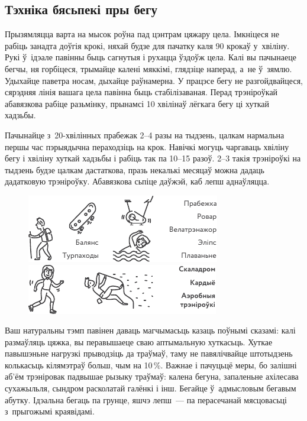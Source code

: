 \subsection*{Тэхніка бясьпекі пры бегу}

Прызямляцца варта на мысок роўна пад цэнтрам цяжару цела. Імкніцеся не рабіць занадта доўгія крокі, няхай будзе для пачатку каля 90 крокаў у~хвіліну. Рукі ў~ідэале павінны быць сагнутыя і рухацца ўздоўж цела. Калі вы пачынаеце бегчы, ня горбіцеся, трымайце калені мяккімі, глядзіце наперад, а~не ў~зямлю. Удыхайце паветра носам, дыхайце раўнамерна. У працэсе бегу не разгойдвайцеся, сярэдняя лінія вашага цела павінна быць стабілізаваная. Перад трэніроўкай абавязкова рабіце разьмінку, прынамсі 10 хвілінаў лёгкага бегу ці хуткай хадзьбы.

Пачынайце з~20-хвілінных прабежак 2--4 разы на тыдзень, цалкам нармальна першы час пэрыядычна пераходзіць на крок. Навічкі могуць чаргаваць хвіліну бегу і хвіліну хуткай хадзьбы і рабіць так па 10--15 разоў. 2--3 такія трэніроўкі на тыдзень будзе цалкам дастаткова, празь некалькі месяцаў можна дадаць дадатковую трэніроўку. Абавязкова сьпіце даўжэй, каб лепш аднаўляцца.

\begin{figure}[htb!]
  \centering
  \includegraphics[scale=1.5]{willpower/ch5/8.pdf}\\
  \medskip
  \includegraphics[scale=1.5]{willpower/ch5/9.pdf}
\end{figure}

Ваш натуральны тэмп павінен даваць магчымасьць казаць поўнымі сказамі: калі размаўляць цяжка, вы перавышаеце сваю аптымальную хуткасьць. Хуткае павышэньне нагрузкі прыводзіць да траўмаў, таму не павялічвайце штотыдзень колькасьць кілямэтраў больш, чым на 10\,\%. Важнае і пачуцьцё меры, бо залішні аб'ём трэніровак падвышае рызыку траўмаў: калена бегуна, запаленьне ахілесава сухажыльля, сындром расколатай галёнкі і інш. Бегайце ў~адмысловым бегавым абутку. Ідэальна бегаць па грунце, яшчэ лепш~--- па перасечанай мясцовасьці з~прыгожымі краявідамі.

